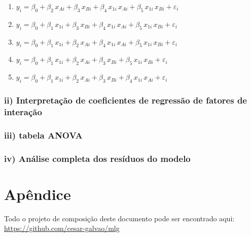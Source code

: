 \documentclass[
  letterpaper,
  DIV=11,
  numbers=noendperiod]{scrartcl}
\begin{document}
\begin{enumerate}
  \item $y_i = \beta_0 + \beta_2 \, x_{Ai} + \beta_3 \, x_{Bi} + \beta_4 \, x_{1i} \, x_{Ai} + \beta_5 \, x_{1i} \, x_{Bi} + \varepsilon_i$
  \item $y_i = \beta_0 + \beta_1 \, x_{1i} + \beta_3 \, x_{Bi} + \beta_4 \, x_{1i} \, x_{Ai} + \beta_5 \, x_{1i} \, x_{Bi} + \varepsilon_i$
  \item $y_i = \beta_0 + \beta_1 \, x_{1i} + \beta_2 \, x_{Ai} + \beta_4 \, x_{1i} \, x_{Ai} + \beta_5 \, x_{1i} \, x_{Bi} + \varepsilon_i$
  \item $y_i = \beta_0 + \beta_1 \, x_{1i} + \beta_2 \, x_{Ai} + \beta_3 \, x_{Bi} + \beta_5 \, x_{1i} \, x_{Bi} + \varepsilon_i$
  \item $y_i = \beta_0 + \beta_1 \, x_{1i} + \beta_2 \, x_{Ai} + \beta_3 \, x_{Bi} + \beta_4 \, x_{1i} \, x_{Ai} + \varepsilon_i$
\end{enumerate}

\hypertarget{ii-interpretauxe7uxe3o-de-coeficientes-de-regressuxe3o-de-fatores-de-interauxe7uxe3o}{%
\subsubsection{ii) Interpretação de coeficientes de regressão de fatores
de
interação}\label{ii-interpretauxe7uxe3o-de-coeficientes-de-regressuxe3o-de-fatores-de-interauxe7uxe3o}}

\hypertarget{iii-tabela-anova}{%
\subsubsection{iii) tabela ANOVA}\label{iii-tabela-anova}}

\hypertarget{iv-anuxe1lise-completa-dos-resuxedduos-do-modelo}{%
\subsubsection{iv) Análise completa dos resíduos do
modelo}\label{iv-anuxe1lise-completa-dos-resuxedduos-do-modelo}}

\hypertarget{apuxeandice}{%
\section{Apêndice}\label{apuxeandice}}

Todo o projeto de composição deste documento pode ser encontrado aqui:
\url{https://github.com/cesar-galvao/mlg}
\end{document}

